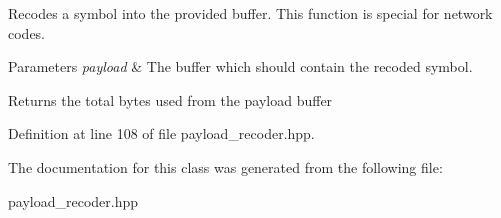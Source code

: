 Recodes a symbol into the provided buffer. This function is special for network codes. 
\begin{DoxyParams}{Parameters}
{\em payload} & The buffer which should contain the recoded symbol. \\
\hline
\end{DoxyParams}
\begin{DoxyReturn}{Returns}
the total bytes used from the payload buffer 
\end{DoxyReturn}


Definition at line 108 of file payload\-\_\-recoder.\-hpp.



The documentation for this class was generated from the following file\-:\begin{DoxyCompactItemize}
\item 
payload\-\_\-recoder.\-hpp\end{DoxyCompactItemize}
